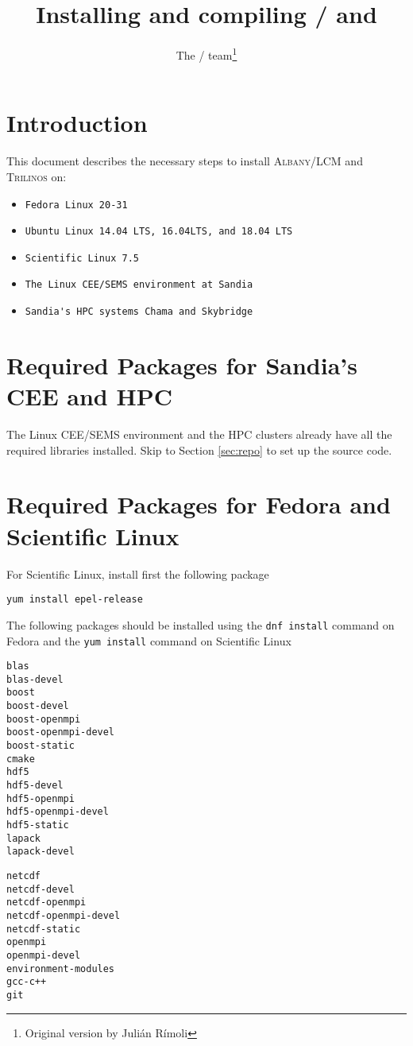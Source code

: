 \documentclass{article}
\title{Installing and compiling \albany{}/\lcm{} and
  \trilinos{}}
\author{The \albany{}/\lcm{} team\thanks{Original version by Juli\'an
    R\'imoli}}
\newcommand{\trilinos}{\textsc{Trilinos}}
\newcommand{\albany}{\textsc{Albany}}
\newcommand{\lcm}{\textsc{LCM}}
\begin{document}
\maketitle

\section{Introduction}
This document describes the necessary steps to install \albany{}/\lcm{} and
\trilinos{} on:
\begin{itemize}
\item \verb+Fedora Linux 20-31+
\item \verb+Ubuntu Linux 14.04 LTS, 16.04LTS, and 18.04 LTS+
\item \verb+Scientific Linux 7.5+
\item \verb+The Linux CEE/SEMS environment at Sandia+
\item \verb+Sandia's HPC systems Chama and Skybridge+
\end{itemize}

\section{Required Packages for Sandia's CEE and HPC}
The Linux CEE/SEMS environment and the HPC clusters already have all the
required libraries installed. Skip to Section \ref{sec:repo} to set up the
source code.

\section{Required Packages for Fedora and Scientific Linux}
For Scientific Linux, install first the following package
\begin{verbatim}
yum install epel-release
\end{verbatim}
The following packages should be installed using the \verb+dnf install+ command
on Fedora and the \verb+yum install+ command on Scientific Linux
\begin{verbatim}
blas
blas-devel
boost
boost-devel
boost-openmpi
boost-openmpi-devel
boost-static
cmake
hdf5
hdf5-devel
hdf5-openmpi
hdf5-openmpi-devel
hdf5-static
lapack
lapack-devel
\end{verbatim}

\begin{verbatim}
netcdf
netcdf-devel
netcdf-openmpi
netcdf-openmpi-devel
netcdf-static
openmpi
openmpi-devel
environment-modules
gcc-c++
git
\end{verbatim}
\end{document}
